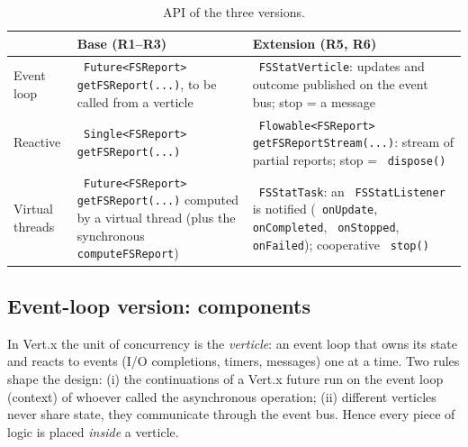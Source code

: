 \documentclass[11pt,a4paper]{article}
\newcommand{\code}[1]{\texttt{\hyphenchar\font=-1 #1}}
\begin{document}
\begin{table}[H]
\centering\small
\begin{tabularx}{\textwidth}{@{}lYY@{}}
\toprule
 & \textbf{Base (R1--R3)} & \textbf{Extension (R5, R6)} \\
\midrule
Event loop & \code{Future<FSReport> getFSReport(...)}, to be called from a verticle &
  \code{FSStatVerticle}: updates and outcome published on the event bus; stop = a message \\
Reactive & \code{Single<FSReport> getFSReport(...)} &
  \code{Flowable<FSReport> getFSReportStream(...)}: stream of partial reports; stop = \code{dispose()} \\
Virtual threads & \code{Future<FSReport> getFSReport(...)} computed by a virtual thread
  (plus the synchronous \code{computeFSReport}) &
  \code{FSStatTask}: an \code{FSStatListener} is notified (\code{onUpdate}, \code{onCompleted}, \code{onStopped}, \code{onFailed}); cooperative \code{stop()} \\
\bottomrule
\end{tabularx}
\caption{API of the three versions.}\label{tab:api}
\end{table}

\subsection{Event-loop version: components}

In Vert.x the unit of concurrency is the \emph{verticle}: an event loop that owns its state and
reacts to events (I/O completions, timers, messages) one at a time. Two rules shape the design:
(i) the continuations of a Vert.x future run on the event loop (context) of whoever called the
asynchronous operation; (ii) different verticles never share state, they communicate through the
event bus. Hence every piece of logic is placed \emph{inside} a verticle.
\end{document}
